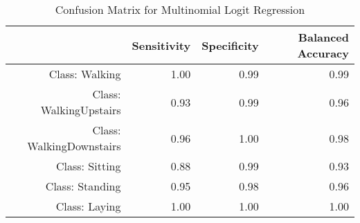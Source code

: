 \begin{table}[ht]
\centering
\caption{Confusion Matrix for Multinomial Logit Regression} 
\label{tab:conmat_dmr}
\begin{tabular}{rrrr}
  \hline
 & Sensitivity & Specificity & Balanced Accuracy \\ 
  \hline
Class: Walking & 1.00 & 0.99 & 0.99 \\ 
  Class: WalkingUpstairs & 0.93 & 0.99 & 0.96 \\ 
  Class: WalkingDownstairs & 0.96 & 1.00 & 0.98 \\ 
  Class: Sitting & 0.88 & 0.99 & 0.93 \\ 
  Class: Standing & 0.95 & 0.98 & 0.96 \\ 
  Class: Laying & 1.00 & 1.00 & 1.00 \\ 
   \hline
\end{tabular}
\end{table}
